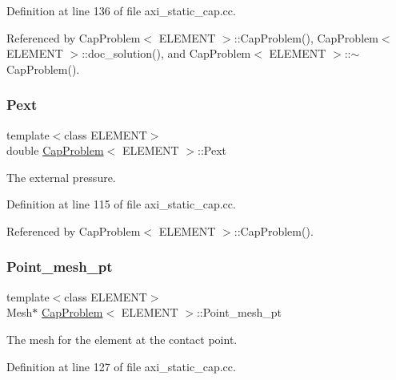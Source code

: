 Definition at line 136 of file axi\+\_\+static\+\_\+cap.\+cc.



Referenced by Cap\+Problem$<$ E\+L\+E\+M\+E\+N\+T $>$\+::\+Cap\+Problem(), Cap\+Problem$<$ E\+L\+E\+M\+E\+N\+T $>$\+::doc\+\_\+solution(), and Cap\+Problem$<$ E\+L\+E\+M\+E\+N\+T $>$\+::$\sim$\+Cap\+Problem().

\mbox{\label{classCapProblem_a6fcc40a7331c00739923b49c167b396f}} 
\subsubsection{\texorpdfstring{Pext}{Pext}}
{\footnotesize\ttfamily template$<$class E\+L\+E\+M\+E\+NT$>$ \\
double \hyperlink{classCapProblem}{Cap\+Problem}$<$ E\+L\+E\+M\+E\+NT $>$\+::Pext\hspace{0.3cm}{\ttfamily [private]}}



The external pressure. 



Definition at line 115 of file axi\+\_\+static\+\_\+cap.\+cc.



Referenced by Cap\+Problem$<$ E\+L\+E\+M\+E\+N\+T $>$\+::\+Cap\+Problem().

\mbox{\label{classCapProblem_ad1ee833de811bacb3ba3bd9630fe4154}} 
\subsubsection{\texorpdfstring{Point\+\_\+mesh\+\_\+pt}{Point\_mesh\_pt}}
{\footnotesize\ttfamily template$<$class E\+L\+E\+M\+E\+NT$>$ \\
Mesh$\ast$ \hyperlink{classCapProblem}{Cap\+Problem}$<$ E\+L\+E\+M\+E\+NT $>$\+::Point\+\_\+mesh\+\_\+pt\hspace{0.3cm}{\ttfamily [private]}}



The mesh for the element at the contact point. 



Definition at line 127 of file axi\+\_\+static\+\_\+cap.\+cc.



